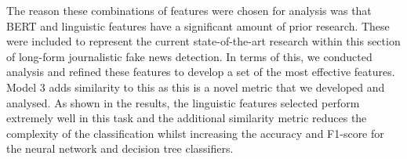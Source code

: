 \documentclass{article}
\begin{document}
The reason these combinations of features were chosen for analysis was that BERT and linguistic features have a significant amount of prior research. These were included to represent the current state-of-the-art research within this section of long-form journalistic fake news detection. In terms of this, we conducted analysis and refined these features to develop a set of the most effective features. Model 3 adds similarity to this as this is a novel metric that we developed and analysed. As shown in the results, the linguistic features selected perform extremely well in this task and the additional similarity metric reduces the complexity of the classification whilst increasing the accuracy and F1-score for the neural network and decision tree classifiers.

\end{document}
